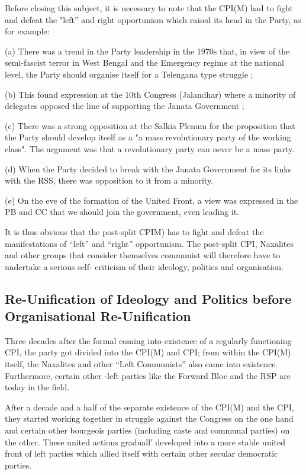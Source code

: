 Before closing this subject, it is necessary to note that the 
CPI(M) had to fight and defeat the "left” and right opportunism 
which raised its head in the Party, as for example: 

(a) There was a trend in the Party leadership in the 1970s 
that, in view of the semi-fascist terror in West Bengal and the Emergency regime at the national level, the Party should organise itself for a Telengana type struggle ;

(b) This found expression at the 10th Congress (Jalandhar) where a minority of delegates opposed the line of supporting the Janata Government ;

(c) There was a strong opposition at the Salkia Plenum for the proposition that the Party should develop itself as a "a mass revolutionary party of the working class". The argument was that a revolutionary party can never be a mass party.

(d) When the Party decided to break with the Janata Government for its links with the RSS, there was opposition to it from a minority.

(e) On the eve of the formation of the United Front, a view was expressed in the PB and CC that we should join the government, even leading it. 

It is thus obvious that the post-split CPIM) has to fight and defeat the manifestations of “left” and “right” opportunism. The post-split CPI, Naxalites and other groups that consider 
themselves communist will therefore have to undertake a serious self- criticism of their ideology, politics and organisation. 

\subsection{Re-Unification of Ideology and Politics before Organisational Re-Unification }

Three decades after the formal coming into existence of a regularly functioning CPI, the party got divided into the CPI(M) and CPI; from within the CPI(M) itself, the Naxalites and other “Left Communists” also came into existence. Furthermore, certain other -left parties like the Forward Bloc and the RSP are today in the field. 

After a decade and a half of the separate existence of the CPI(M) and the CPI, they started working together in struggle against the Congress on the one hand and certain other bourgeois parties (including caste and communal parties) on the other. These united actions graduall' developed into a more stable united front of left parties which allied itself with certain other secular democratic parties. 

